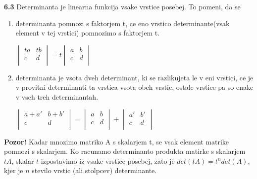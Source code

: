 \documentclass{article}
\begin{document}
\begin{multicols}{4}
	\textbf{6.3} Determinanta je linearna funkcija vsake vrstice posebej. To pomeni, da se
	\begin{enumerate}
		\item determinanta pomnozi s faktorjem t, ce eno vrstico determinante(vsak element v tej vrstici)
		      pomnozimo s faktorjem t.
		      \begin{center}
			      \begin{math}
				      \begin{vmatrix}
					      ta & tb \\
					      c  & d  \\
				      \end{vmatrix}
				      = t
				      \begin{vmatrix}
					      a & b \\
					      c & d \\
				      \end{vmatrix}
			      \end{math}
		      \end{center}
		\item determinanta je vsota dveh determinant, ki se razlikujeta le v eni vrstici,
		      ce je v provitni determinanti ta vrstica vsota obeh vrstic, ostale vrstice pa so enake
		      v vseh treh determinantah.
		      \begin{center}
			      \begin{math}
				      \begin{vmatrix}
					      a + a' & b + b' \\
					      c      & d      \\
				      \end{vmatrix} =
				      \begin{vmatrix}
					      a & b \\
					      c & d \\
				      \end{vmatrix} +
				      \begin{vmatrix}
					      a' & b' \\
					      c  & d  \\
				      \end{vmatrix}
			      \end{math}
		      \end{center}
	\end{enumerate}

	\textbf{Pozor!} Kadar mnozimo matriko A s skalarjem t, se vsak element matrike pomnozi s skalarjem.
	Ko racunamo determinanto produkta matirke s skalarjem $tA$, skalar $t$ izpostavimo iz vsake vrstice posebej,
	zato je $det(tA) = t^{n}det(A)$, kjer je $n$ stevilo vrstic (ali stolpcev) determinante.


\end{multicols}
\end{document}
